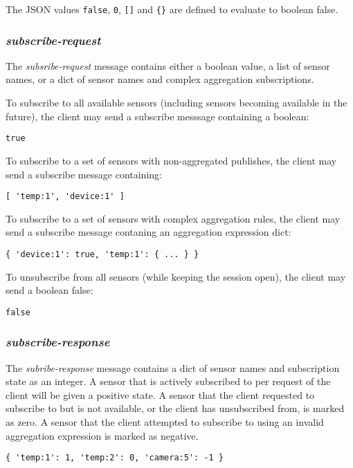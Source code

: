 \documentclass[a4paper]{article}
\begin{document}
The JSON values \texttt{false}, \texttt{0}, \texttt{[]} and \texttt{\{\}} are defined to evaluate to boolean false.

\subsubsection{\emph{subscribe-request}}
The \emph{subsribe-request} message contains either a boolean value, a list of sensor names, or a dict of sensor names and complex aggregation subscriptions.

To subscribe to all available sensors (including sensors becoming available in the future), the client may send a subscribe messsage containing a boolean:
\begin{verbatim}
true
\end{verbatim}

To subscribe to a set of sensors with non-aggregated publishes, the client may send a subscribe message containing:
\begin{verbatim}
[ 'temp:1', 'device:1' ]
\end{verbatim}

To subscribe to a set of sensors with complex aggregation rules, the client may send a subscribe message contaning an aggregation expression dict:
\begin{verbatim}
{ 'device:1': true, 'temp:1': { ... } }
\end{verbatim}

To unsubscribe from all sensors (while keeping the session open), the client may send a boolean false:
\begin{verbatim}
false
\end{verbatim}

\subsubsection{\emph{subscribe-response}}
The \emph{subribe-response} message contains a dict of sensor names and subscription state as an integer. A sensor that is actively subscribed to per request of the client will be given a positive state. A sensor that the client requested to subscribe to but is not available, or the client has unsubscribed from, is marked as zero. A sensor that the client attempted to subscribe to using an invalid aggregation expression is marked as negative.

\begin{verbatim}
{ 'temp:1': 1, 'temp:2': 0, 'camera:5': -1 }
\end{verbatim}
\end{document}
